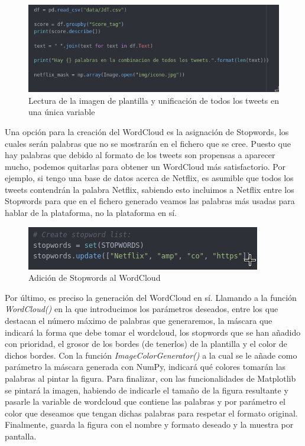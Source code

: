 \begin{figure}[H]
	\centering
	\includegraphics[scale=.5]{imagenes/lectura-imagen-words.png}
	\caption{Lectura de la imagen de plantilla y unificación de todos los tweets en una única variable}
	\label{fig:include-words}
\end{figure}


Una opción para la creación del WordCloud es la asignación de Stopwords, los cuales serán palabras que no se mostrarán en el fichero que se cree. Puesto que hay palabras que debido al formato de los tweets son propensas a aparecer mucho, podemos quitarlas para obtener un WordCloud más satisfactorio. Por ejemplo, si tengo una base de datos acerca de Netflix, es asumible que todos los tweets contendrán la palabra Netflix, sabiendo esto incluimos a Netflix entre los Stopwords para que en el fichero generado veamos las palabras más usadas para hablar de la plataforma, no la plataforma en sí. 

\begin{figure}[H]
	\centering
	\includegraphics[scale=.7]{imagenes/stopword.png}
	\caption{Adición de Stopwords al WordCloud}
	\label{fig:stopwords}
\end{figure}


Por último, es preciso la generación del WordCloud en sí. Llamando a la función \textit{WordCloud()} en la que introducimos los parámetros deseados, entre los que destacan el número máximo de palabras que generaremos, la máscara que indicará la forma que debe tomar el wordcloud, los stopwords que se han añadido con prioridad, el grosor de los bordes (de tenerlos) de la plantilla y el color de dichos bordes. Con la función \textit{ImageColorGenerator()} a la cual se le añade como parámetro la máscara generada con NumPy, indicará qué colores tomarán las palabras al pintar la figura. Para finalizar, con las funcionalidades de Matplotlib se pintará la imagen, habiendo de indicarle el tamaño de la figura resultante y pasarle la variable de wordcloud que contiene las palabras y por parámetro el color que deseamos que tengan dichas palabras para respetar el formato original. Finalmente, guarda la figura con el nombre y formato deseado y la muestra por pantalla. 

